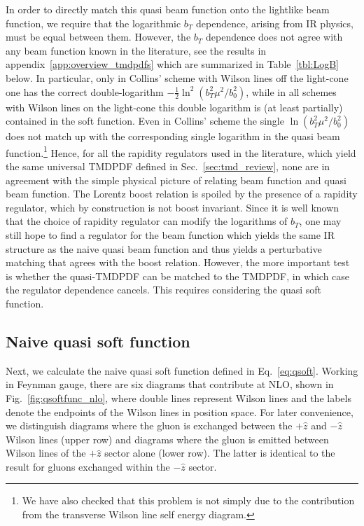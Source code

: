 \documentclass[11pt,a4paper]{article}
\DeclareRobustCommand{\eq}[1]{Eq.~\eqref{eq:#1}}
\DeclareRobustCommand{\fig}[1]{Fig.~\ref{fig:#1}}
\DeclareRobustCommand{\app}[1]{appendix~\ref{app:#1}}
\DeclareRobustCommand{\sec}[1]{Sec.~\ref{sec:#1}}
\DeclareRobustCommand{\tbl}[1]{Table~\ref{tbl:#1}}
\begin{document}
In order to directly match this quasi beam function onto the lightlike beam function,
we require that the logarithmic $b_T$ dependence, arising from IR physics, must be equal between them.
However, the $b_T$ dependence does not agree with any beam function known in the literature, see the results in \app{overview_tmdpdfs} which are summarized in \tbl{LogB} below.
In particular, only in Collins' scheme with Wilson lines off the light-cone one has the correct double-logarithm $-\frac12 \ln^2(b_T^2\mu^2/b_0^2)$, while in all schemes with Wilson lines on the light-cone this double logarithm is (at least partially) contained in the soft function. Even in Collins' scheme the single $\ln(b_T^2\mu^2/b_0^2)$ does not match up with the corresponding single logarithm in the quasi beam function.\footnote{We have also checked that this problem is not simply due to the contribution from the transverse Wilson line self energy diagram.}
Hence, for all the rapidity regulators used in the literature, which yield the same universal TMDPDF defined in \sec{tmd_review}, none are in agreement with
the simple physical picture of relating beam function and quasi beam function.  
The Lorentz boost relation is spoiled by the presence of a rapidity regulator, which by construction is not boost invariant.
Since it is well known that the choice of rapidity regulator can modify the logarithms of $b_T$,
one may still hope to find a regulator for the beam function which yields the same IR structure as the naive quasi beam function and thus yields a perturbative matching that agrees with the boost relation. 
However, the more important test is whether the quasi-TMDPDF can be matched to the TMDPDF, in which case the regulator dependence cancels. This requires considering the quasi soft function.



\subsection{Naive quasi soft function}
\label{sec:qsoft_naive_nlo}

Next, we calculate the naive quasi soft function defined in \eq{qsoft}.
Working in Feynman gauge, there are six diagrams that contribute at NLO,
shown in \fig{qsoftfunc_nlo}, where double lines represent Wilson lines
and the labels denote the endpoints of the Wilson lines in position space.
For later convenience, we distinguish diagrams where the gluon is exchanged
between the $+\hat z$ and $-\hat z$ Wilson lines (upper row)
and diagrams where the gluon is emitted between Wilson lines of the $+\hat z$ sector alone (lower row).
The latter is identical to the result for gluons exchanged within the $- \hat z$ sector.
\end{document}
